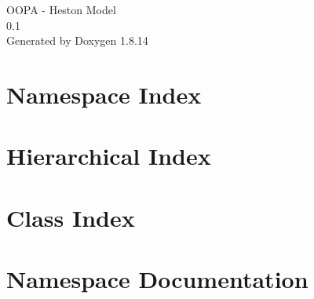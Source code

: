 \documentclass[twoside]{book}
\newcommand{\+}{\discretionary{\mbox{\scriptsize$\hookleftarrow$}}{}{}}
\newcommand{\clearemptydoublepage}{%
  \newpage{\pagestyle{empty}\cleardoublepage}%
}
\begin{document}
\hypersetup{pageanchor=false,
             bookmarksnumbered=true,
             pdfencoding=unicode
            }
\begin{titlepage}
\vspace*{7cm}
\begin{center}%
{\Large O\+O\+PA -\/ Heston Model \\[1ex]\large 0.\+1 }\\
\vspace*{1cm}
{\large Generated by Doxygen 1.8.14}\\
\end{center}
\end{titlepage}
\clearemptydoublepage
{}
\tableofcontents
\clearemptydoublepage
{}
\hypersetup{pageanchor=true}

\chapter{Namespace Index}

\chapter{Hierarchical Index}

\chapter{Class Index}

\chapter{Namespace Documentation}




\end{document}
